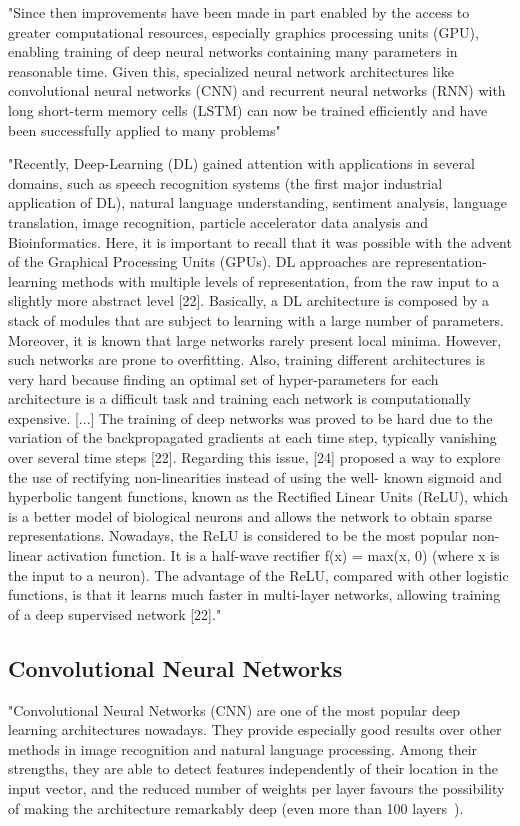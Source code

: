 "Since then improvements have been made in part enabled by the access to greater computational resources, especially graphics processing units (GPU), enabling training of deep neural networks containing many parameters in reasonable time. Given this, specialized neural network architectures like convolutional neural networks (CNN) and recurrent neural networks (RNN) with long short-term memory cells (LSTM) can now be trained efficiently and have been successfully applied to many problems" \cite{Jurtz2017}

"Recently, Deep-Learning (DL) gained attention with applications in several domains, such as speech recognition systems (the first major industrial application of DL), natural language understanding, sentiment analysis, language translation, image recognition, particle accelerator data analysis and Bioinformatics. Here, it is important to recall that it was possible with the advent of the Graphical Processing Units (GPUs). DL approaches are representation-learning methods with multiple levels of representation, from the raw input to a slightly more abstract level [22]. Basically, a DL architecture is composed by a stack of modules that are subject to learning with a large number of parameters. Moreover, it is known that large networks rarely present local minima. However, such networks are prone to overfitting. Also, training different architectures is very hard because finding an optimal set of hyper-parameters for each architecture is a difficult task and training each network is computationally expensive.
[...]
The training of deep networks was proved to be hard due to the variation of the backpropagated gradients at each time step, typically vanishing over several time steps [22]. Regarding this issue, [24] proposed a way to explore the use of rectifying non-linearities instead of using the well- known sigmoid and hyperbolic tangent functions, known as the Rectified Linear Units (ReLU), which is a better model of biological neurons and allows the network to obtain sparse representations. Nowadays, the ReLU is considered to be the most popular non-linear activation function. It is a half-wave rectifier f(x) = max(x, 0) (where x is the input to a neuron). The advantage of the ReLU, compared with other logistic functions, is that it learns much faster in multi-layer networks, allowing training of a deep supervised network [22]." \cite{Hattori2017}

	\subsection{Convolutional Neural Networks}
	"Convolutional Neural Networks (CNN) are one of the most popular deep learning architectures nowadays. They provide especially good results over other methods in image recognition and natural language processing. Among their strengths, they are able to detect features independently of their location in the input vector, and the reduced number of weights per layer favours the possibility of making the architecture remarkably deep (even more than 100 layers~\cite{He2015}).
	
